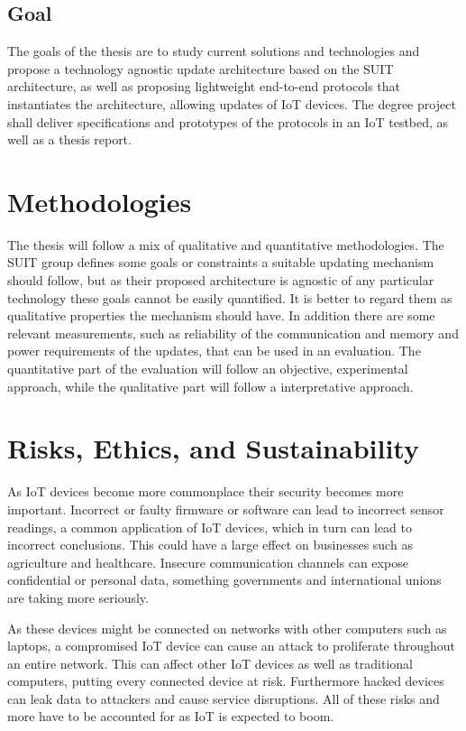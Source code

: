 \documentclass[0-thesis.tex]{subfiles}
\begin{document}
\subsection{Goal}
The goals of the thesis are to study current solutions and technologies and propose a
technology agnostic update architecture based on the SUIT architecture, as well as
proposing lightweight end-to-end protocols that instantiates the architecture, allowing
updates of IoT devices. The degree project shall deliver specifications and prototypes of
the protocols in an IoT testbed, as well as a thesis report.

\section{Methodologies}
The thesis will follow a mix of qualitative and quantitative methodologies. The SUIT group
defines some goals or constraints a suitable updating mechanism should follow, but as
their proposed architecture is agnostic of any particular technology these goals cannot be
easily quantified. It is better to regard them as qualitative properties the mechanism
should have. In addition there are some relevant measurements, such as reliability of the
communication and memory and power requirements of the updates, that can be used in an
evaluation. The quantitative part of the evaluation will follow an objective, experimental
approach, while the qualitative part will follow a interpretative approach.

\section{Risks, Ethics, and Sustainability}
As IoT devices become more commonplace their security becomes more important. Incorrect or
faulty firmware or software can lead to incorrect sensor readings, a common application of
IoT devices, which in turn can lead to incorrect conclusions. This could have a large
effect on businesses such as agriculture and healthcare. Insecure communication channels
can expose confidential or personal data, something governments and international unions
are taking more seriously. 

As these devices might be connected on networks with other computers such as laptops, a
compromised IoT device can cause an attack to proliferate throughout an entire network.
This can affect other IoT devices as well as traditional computers, putting every
connected device at risk. Furthermore hacked devices can leak data to attackers and cause
service disruptions. All of these risks and more have to be accounted for as IoT is
expected to boom.
\end{document}
